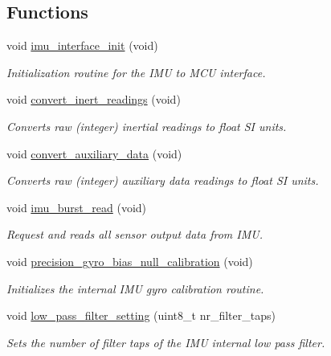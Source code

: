 \subsection*{\-Functions}
\begin{DoxyCompactItemize}
\item 
void \hyperlink{group__imu__interface_gaffa3d61bdee6ac9ce4d8c30017fca3c9}{imu\-\_\-interface\-\_\-init} (void)
\begin{DoxyCompactList}\small\item\em \-Initialization routine for the \-I\-M\-U to \-M\-C\-U interface. \end{DoxyCompactList}\item 
void \hyperlink{group__imu__interface_gae38a1d022cfc792215e943bdfd63483a}{convert\-\_\-inert\-\_\-readings} (void)
\begin{DoxyCompactList}\small\item\em \-Converts raw (integer) inertial readings to float \-S\-I units. \end{DoxyCompactList}\item 
void \hyperlink{group__imu__interface_gab9e72cf471b9cdc12145d3d185fe5f05}{convert\-\_\-auxiliary\-\_\-data} (void)
\begin{DoxyCompactList}\small\item\em \-Converts raw (integer) auxiliary data readings to float \-S\-I units. \end{DoxyCompactList}\item 
void \hyperlink{group__imu__interface_ga646f88d2978376b42020975d5802919d}{imu\-\_\-burst\-\_\-read} (void)
\begin{DoxyCompactList}\small\item\em \-Request and reads all sensor output data from \-I\-M\-U. \end{DoxyCompactList}\item 
void \hyperlink{group__imu__interface_ga71833d5eb4e7c71baaaa9e707a6c1f8d}{precision\-\_\-gyro\-\_\-bias\-\_\-null\-\_\-calibration} (void)
\begin{DoxyCompactList}\small\item\em \-Initializes the internal \-I\-M\-U gyro calibration routine. \end{DoxyCompactList}\item 
void \hyperlink{group__imu__interface_gaba5c2c784f3302cfb7972bbf5fef48d2}{low\-\_\-pass\-\_\-filter\-\_\-setting} (uint8\-\_\-t nr\-\_\-filter\-\_\-taps)
\begin{DoxyCompactList}\small\item\em \-Sets the number of filter taps of the \-I\-M\-U internal low pass filter. \end{DoxyCompactList}\end{DoxyCompactItemize}
